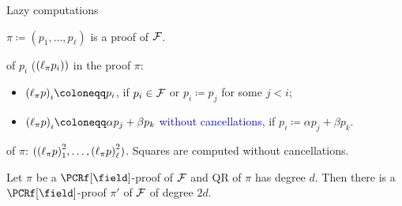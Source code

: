 \begin{frame}{Lazy computations \hspace{5pt} }
    
    $\pi \coloneqq (p_1, \dots, p_{\ell})$ is a proof of $\mathcal{F}$.

    \pause
     of $p_i$ (${(\ell_{\pi}{p_i})})$ in the proof $\pi$:
    \begin{itemize}
        \item $\lazy{p}_i \coloneqq p_i$, if $p_i \in \mathcal{F}$ or $p_i \coloneqq p_j$ for some $j < i$;
        \item $\lazy{p}_i \coloneqq \alpha p_j + \beta p_k$ \textcolor{blue}{without cancellations}, if
            $p_i \coloneqq \alpha p_j + \beta p_k$.
    \end{itemize}

    \pause
     of $\pi$: $({(\ell_{\pi}{p})}_1^2, \dots, {(\ell_{\pi}{p})}_{\ell}^2)$. Squares are computed without
    cancellations.

    \pause
    \begin{lemma}
        Let $\pi$ be a $\PCRf[\field]$-proof of $\mathcal{F}$ and QR of $\pi$ has degree $d$. Then there is a
        $\PCRf[\field]$-proof $\pi'$ of $\mathcal{F}$ of degree $2d$.
    \end{lemma}
\end{frame}

